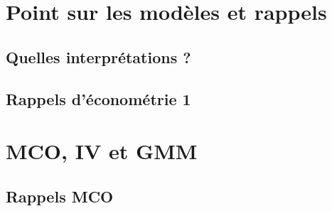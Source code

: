 \documentclass[15pt, french]{article}
\begin{document}

\newpage

\pagestyle{fancy}
\fancyhead[L]{}
\fancyhead[R]{}
\tableofcontents
\break

\pagestyle{fancy}
\fancyhead[L]{\leftmark}
\fancyhead[R]{}

\section{Point sur les modèles et rappels}
%
\subsection{Quelles interprétations ?}
%
\subsection{Rappels d'économétrie 1}
%

\section{MCO, IV et GMM}
%
\subsection{Rappels MCO}
%
\end{document}
